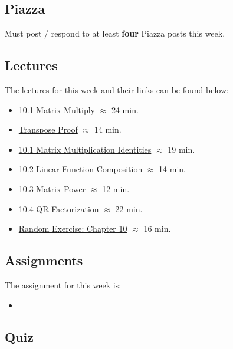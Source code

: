 \subsection{Piazza}

Must post / respond to at least \textbf{four} Piazza posts this week.

\subsection{Lectures}

The lectures for this week and their links can be found below:

\begin{itemize}
    \item \href{https://applied.cs.colorado.edu/mod/hvp/view.php?id=50788}{10.1 Matrix Multiply} $\approx$ 24 min.
    \item \href{https://applied.cs.colorado.edu/mod/hvp/view.php?id=50789}{Transpose Proof} $\approx$ 14 min.
    \item \href{https://applied.cs.colorado.edu/mod/hvp/view.php?id=50790}{10.1 Matrix Multiplication Identities} $\approx$ 19 min.
    \item \href{https://applied.cs.colorado.edu/mod/hvp/view.php?id=50791}{10.2 Linear Function Composition} $\approx$ 14 min.
    \item \href{https://applied.cs.colorado.edu/mod/hvp/view.php?id=50792}{10.3 Matrix Power} $\approx$ 12 min.
    \item \href{https://applied.cs.colorado.edu/mod/hvp/view.php?id=50793}{10.4 QR Factorization} $\approx$ 22 min.
    \item \href{https://applied.cs.colorado.edu/mod/hvp/view.php?id=50794}{Random Exercise: Chapter 10} $\approx$ 16 min.
\end{itemize}

\subsection{Assignments}

The assignment for this week is:

\begin{itemize}
    \item {}
\end{itemize}

\subsection{Quiz}

